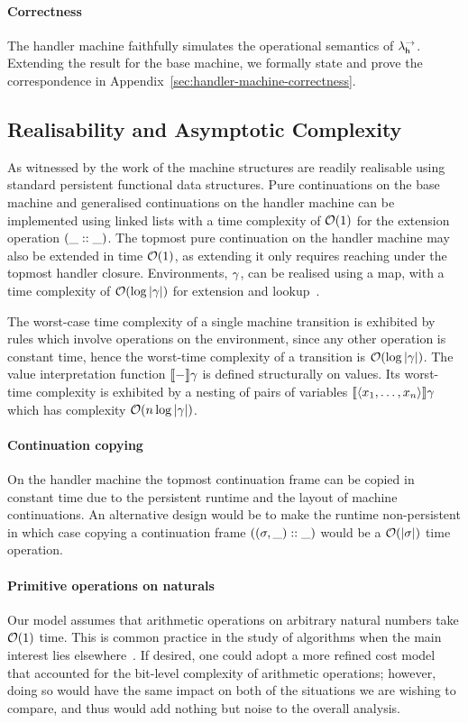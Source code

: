 \documentclass[12pt,phd,lfcs,twoside,openright,logo,leftchapter,normalheadings]{infthesis}
\theoremstyle{plain}
\theoremstyle{definition}
\begin{document}
\paragraph{Correctness}
%
The handler machine faithfully simulates the operational semantics of
$\lambda^\rightarrow_{\mathsf{h}}$.
%
Extending the result for the base machine, we formally state and prove
the correspondence in
Appendix~\ref{sec:handler-machine-correctness}.

\subsection{Realisability and Asymptotic Complexity}
\label{sec:realisability}
As witnessed by the work of \citet{HillerstromL18} the machine
structures are readily realisable using standard persistent functional
data structures.
%
Pure continuations on the base machine and generalised continuations
on the handler machine can be implemented using linked lists with a
time complexity of $\mathcal{O}(1)$ for the extension operation
$(\_::\_)$.
%
The topmost pure continuation on the handler machine may also be
extended in time $\mathcal{O}(1)$, as extending it only requires reaching
under the topmost handler closure.
%
Environments, $\gamma$, can be realised using a map, with a time
complexity of $\mathcal{O}(\log|\gamma|)$ for extension and
lookup~\citep{Okasaki99}.

The worst-case time complexity of a single machine transition is
exhibited by rules which involve operations on the environment, since
any other operation is constant time, hence the worst-time complexity
of a transition is $\mathcal{O}(\log|\gamma|)$.
%
The value interpretation function $\llbracket - \rrbracket \gamma$ is defined
structurally on values. Its worst-time complexity is exhibited by a
nesting of pairs of variables $\llbracket \langle x_1,\dots,x_n \rangle \rrbracket \gamma$ which
has complexity $\mathcal{O}(n\log|\gamma|)$.

\paragraph{Continuation copying} On the handler machine the topmost
continuation frame can be copied in constant time due to the
persistent runtime and the layout of machine continuations. An
alternative design would be to make the runtime non-persistent
%
in which case copying a continuation frame $((\sigma, \_) ::
\_)$ would be a $\mathcal{O}(|\sigma|)$ time operation.

\paragraph{Primitive operations on naturals}
%
Our model assumes that arithmetic operations on arbitrary natural
numbers take $\mathcal{O}(1)$ time. This is common practice in the study of
algorithms when the main interest lies
elsewhere~\citep[Section~2.2]{CormenLRS09}. If desired, one could
adopt a more refined cost model that accounted for the bit-level
complexity of arithmetic operations; however, doing so would have the
same impact on both of the situations we are wishing to compare, and
thus would add nothing but noise to the overall analysis.
\end{document}
